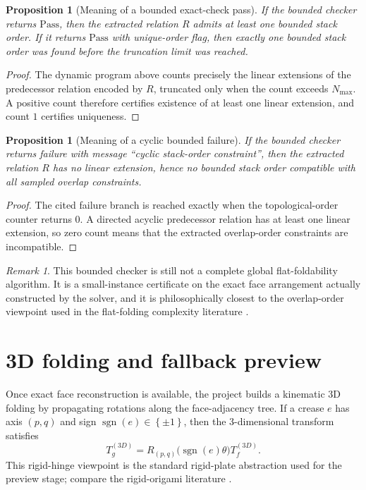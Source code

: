 \documentclass[11pt]{article}
\newtheorem{proposition}[definition]{Proposition}
\theoremstyle{remark}
\newtheorem{remark}[definition]{Remark}
\newcommand{\set}[1]{\left\{ #1 \right\}}
\newcommand{\Pass}{\mathrm{Pass}}
\begin{document}
\begin{proposition}[Meaning of a bounded exact-check pass]
If the bounded checker returns $\Pass$, then the extracted relation $R$ admits
at least one bounded stack order. If it returns $\Pass$ with unique-order flag,
then exactly one bounded stack order was found before the truncation limit was
reached.
\end{proposition}

\begin{proof}
The dynamic program above counts precisely the linear extensions of the
predecessor relation encoded by $R$, truncated only when the count exceeds
$N_{\max}$. A positive count therefore certifies existence of at least one
linear extension, and count $1$ certifies uniqueness.
\end{proof}

\begin{proposition}[Meaning of a cyclic bounded failure]
If the bounded checker returns failure with message ``cyclic stack-order
constraint'', then the extracted relation $R$ has no linear extension, hence no
bounded stack order compatible with all sampled overlap constraints.
\end{proposition}

\begin{proof}
The cited failure branch is reached exactly when the topological-order counter
returns $0$. A directed acyclic predecessor relation has at least one linear
extension, so zero count means that the extracted overlap-order constraints are
incompatible.
\end{proof}

\begin{remark}
This bounded checker is still not a complete global flat-foldability algorithm.
It is a small-instance certificate on the exact face arrangement actually
constructed by the solver, and it is philosophically closest to the
overlap-order viewpoint used in the flat-folding complexity literature
{\cite{bern_hayes,eppstein_flat}}.
\end{remark}

\section{3D folding and fallback preview}

Once exact face reconstruction is available, the project builds a kinematic 3D
folding by propagating rotations along the face-adjacency tree. If a crease $e$
has axis $(p,q)$ and sign $\operatorname{sgn}(e)\in\set{\pm1}$, then the
3-dimensional transform satisfies
\[
T_g^{(3D)}
=
R_{(p,q)}\!\bigl(\operatorname{sgn}(e)\theta\bigr)T_f^{(3D)}.
\]
This rigid-hinge viewpoint is the standard rigid-plate abstraction used for the
preview stage; compare the rigid-origami literature
{\cite{abel_rigid,tachi_simulation}}.
\end{document}
